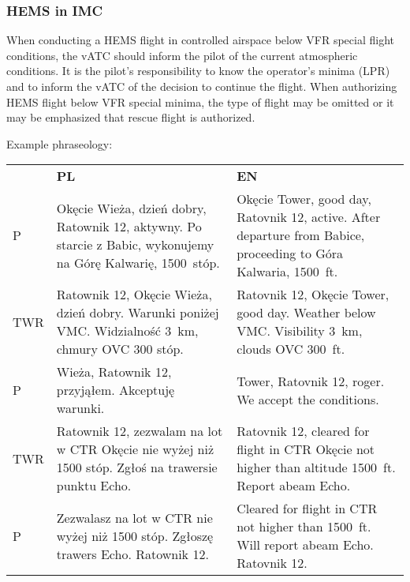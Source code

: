\subsubsection{HEMS in IMC}
When conducting a HEMS flight in controlled airspace below VFR special flight conditions, the vATC should inform the pilot of the current atmospheric conditions. It is the pilot's responsibility to know the operator's minima (LPR) and to inform the vATC of the decision to continue the flight. When authorizing HEMS flight below VFR special minima, the type of flight may be omitted or it may be emphasized that rescue flight is authorized.

Example phraseology:

\begin{tabular}{m{0.6cm} m{8.2cm} m{8.2cm}}
    \rowcolor{vred}& \color{white}\textbf{PL} & \color{white}\textbf{EN}\\%
    P & Okęcie Wieża, dzień dobry, Ratownik 12, aktywny. Po starcie z Babic, wykonujemy na Górę Kalwarię, 1500~stóp.
    & Okęcie Tower, good day, Ratovnik 12, active. After departure from Babice, proceeding to Góra Kalwaria, 1500~ft.\\\midrule
    TWR & Ratownik 12, Okęcie Wieża, dzień dobry. Warunki poniżej VMC. Widzialność 3~km, chmury OVC 300 stóp.
    & Ratovnik 12, Okęcie Tower, good day. Weather below VMC. Visibility 3~km, clouds OVC 300~ft.\\\midrule
    P & Wieża, Ratownik 12, przyjąłem. Akceptuję warunki.&
    Tower, Ratovnik 12, roger. We accept the conditions.\\\midrule
    TWR & Ratownik 12, zezwalam na lot w CTR Okęcie nie wyżej niż 1500 stóp. Zgłoś na trawersie punktu Echo.
    & Ratovnik 12, cleared for flight in CTR Okęcie not higher than altitude 1500~ft. Report abeam Echo.\\\midrule
    P & Zezwalasz na lot w CTR nie wyżej niż 1500 stóp. Zgłoszę trawers Echo. Ratownik 12.
    & Cleared for flight in CTR not higher than 1500~ft. Will report abeam Echo. Ratovnik 12.\\\bottomrule
\end{tabular}